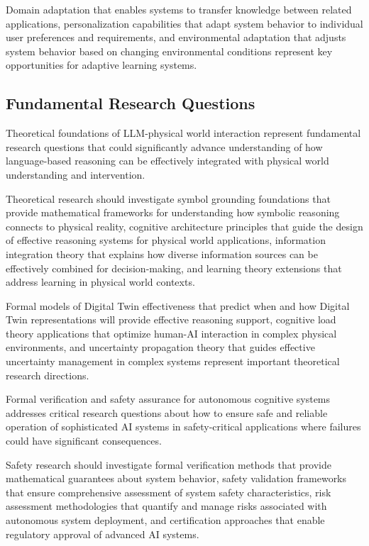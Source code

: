 Domain adaptation that enables systems to transfer knowledge between related applications, personalization capabilities that adapt system behavior to individual user preferences and requirements, and environmental adaptation that adjusts system behavior based on changing environmental conditions represent key opportunities for adaptive learning systems.

\subsection{Fundamental Research Questions}

Theoretical foundations of LLM-physical world interaction represent fundamental research questions that could significantly advance understanding of how language-based reasoning can be effectively integrated with physical world understanding and intervention.

Theoretical research should investigate symbol grounding foundations that provide mathematical frameworks for understanding how symbolic reasoning connects to physical reality, cognitive architecture principles that guide the design of effective reasoning systems for physical world applications, information integration theory that explains how diverse information sources can be effectively combined for decision-making, and learning theory extensions that address learning in physical world contexts.

Formal models of Digital Twin effectiveness that predict when and how Digital Twin representations will provide effective reasoning support, cognitive load theory applications that optimize human-AI interaction in complex physical environments, and uncertainty propagation theory that guides effective uncertainty management in complex systems represent important theoretical research directions.

Formal verification and safety assurance for autonomous cognitive systems addresses critical research questions about how to ensure safe and reliable operation of sophisticated AI systems in safety-critical applications where failures could have significant consequences.

Safety research should investigate formal verification methods that provide mathematical guarantees about system behavior, safety validation frameworks that ensure comprehensive assessment of system safety characteristics, risk assessment methodologies that quantify and manage risks associated with autonomous system deployment, and certification approaches that enable regulatory approval of advanced AI systems.

